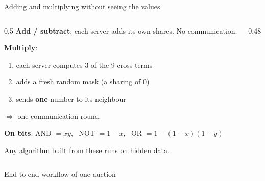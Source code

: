 \documentclass[aspectratio=169,11pt]{beamer}
\newcommand{\pdiagram}[2][\linewidth]{\resizebox{#1}{!}{}}
\begin{document}
\begin{frame}{Adding and multiplying without seeing the values}
  \begin{columns}[c]
    \begin{column}{0.5\textwidth}
      \small
      \textbf{Add / subtract}: each server adds its own shares.
      \alert{No communication.}
      \smallskip

      \textbf{Multiply}:
      \begin{enumerate}
        \item each server computes 3 of the 9 cross terms
        \item adds a fresh random mask (a sharing of 0)
        \item sends \textbf{one} number to its neighbour
      \end{enumerate}
      $\Rightarrow$ \alert{one communication round.}
      \smallskip

      \textbf{On bits}: AND $= x y$, \ NOT $= 1 - x$, \ OR $= 1 - (1-x)(1-y)$
      \smallskip

      Any algorithm built from these runs on hidden data.
    \end{column}
    \begin{column}{0.48\textwidth}
      \centering
      \pdiagram[\linewidth]{multiply}
    \end{column}
  \end{columns}
\end{frame}

\begin{frame}{End-to-end workflow of one auction}
  \centering
  \pdiagram[0.9\linewidth]{workflow}
\end{frame}
\end{document}
